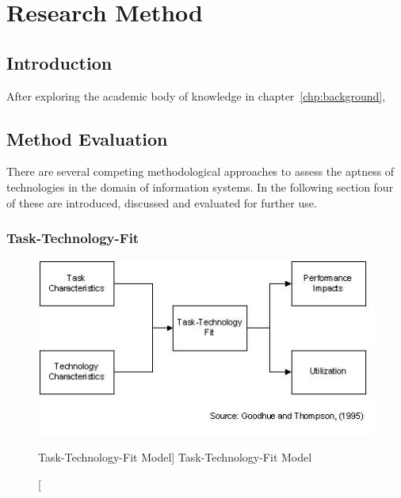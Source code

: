 \chapter{Research Method}\label{chp:researchMethod}


\section{Introduction}

After exploring the academic body of knowledge in chapter~\vref{chp:background}, 


\section{Method Evaluation}

There are several competing methodological approaches to assess the aptness of technologies in the domain of information systems. In the following section four of these are introduced, discussed and evaluated for further use.

    
    \subsection{Task-Technology-Fit}
    \begin{figure}[ht]
        \includegraphics[width=0.7\linewidth]{images/methodology/ttf.jpg}\centering
        \caption
        [Task-Technology-Fit Model]
        {Task-Technology-Fit Model \cite{Goodhue1995Task-TechnologyPerformance}}
    \end{figure}
    
